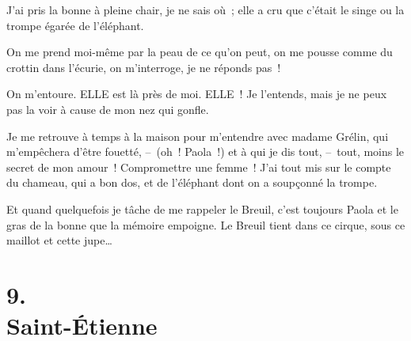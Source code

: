 \documentclass[french,twoside]{book} %
\begin{document}
J’ai pris la bonne à pleine chair, je ne sais où ; elle a cru que c’était le singe ou la trompe égarée de l’éléphant.\par
On me prend moi-même par la peau de ce qu’on peut, on me pousse comme du crottin dans l’écurie, on m’interroge, je ne réponds pas !\par
On m’entoure. ELLE est là près de moi. ELLE ! Je l’entends, mais je ne peux pas la voir à cause de mon nez qui gonfle.\par
\bigbreak
\noindent Je me retrouve à temps à la maison pour m’entendre avec madame Grélin, qui m’empêchera d’être fouetté, – (oh ! Paola !) et à qui je dis tout, – tout, moins le secret de mon amour ! Compromettre une femme ! J’ai tout mis sur le compte du chameau, qui a bon dos, et de l’éléphant dont on a soupçonné la trompe.\par
Et quand quelquefois je tâche de me rappeler le Breuil, c’est toujours Paola et le gras de la bonne que la mémoire empoigne. Le Breuil tient dans ce cirque, sous ce maillot et cette jupe…
\section[{9. Saint-Étienne}]{9. \\
Saint-Étienne}\renewcommand{\leftmark}{9. \\
Saint-Étienne}
\end{document}
